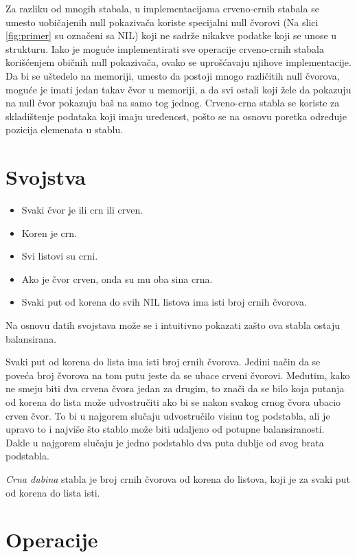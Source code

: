 \documentclass[a4paper]{article}
\begin{document}
Za razliku od mnogih stabala, u implementacijama crveno-crnih stabala se umesto uobičajenih null pokazivača koriste specijalni null čvorovi (Na slici \ref{fig:primer} su označeni sa NIL) koji ne sadrže nikakve podatke
koji se unose u strukturu. Iako je moguće implementirati sve operacije crveno-crnih stabala korišćenjem običnih null pokazivača, ovako se uprošćavaju njihove implementacije.
Da bi se uštedelo na memoriji, umesto da postoji mnogo različitih null čvorova, moguće je imati jedan takav čvor u memoriji, a da svi ostali koji žele da pokazuju na null čvor pokazuju
baš na samo tog jednog.
Crveno-crna stabla se koriste za skladištenje podataka koji imaju uređenost, pošto se na osnovu poretka određuje pozicija elemenata u stablu.
\section{Svojstva}
\label{sec:svojstva}

\begin{itemize}
        \item Svaki čvor je ili crn ili crven.
        \item Koren je crn.
        \item Svi listovi su crni.
        \item Ako je čvor crven, onda su mu oba sina crna.
        \item Svaki put od korena do svih NIL listova ima isti broj crnih čvorova.
\end{itemize}

Na osnovu datih svojstava može se i intuitivno pokazati zašto ova stabla ostaju balansirana.

Svaki put od korena do lista ima isti broj crnih čvorova. Jedini način da se poveća broj čvorova na 
tom putu jeste da se ubace crveni čvorovi. Međutim, kako ne smeju biti dva crvena čvora jedan za drugim,
to znači da se bilo koja putanja od korena do lista može udvostručiti ako bi se nakon svakog crnog čvora
ubacio crven čvor. To bi u najgorem slučaju udvostručilo visinu tog podstabla, ali je upravo to i najviše
što stablo može biti udaljeno od potupne balansiranosti. Dakle u najgorem slučaju je jedno podstablo dva puta
dublje od svog brata podstabla.

\textit{Crna dubina} stabla je broj crnih čvorova od korena do listova, koji je za svaki put od korena do lista isti.

\section{Operacije}
\end{document}
